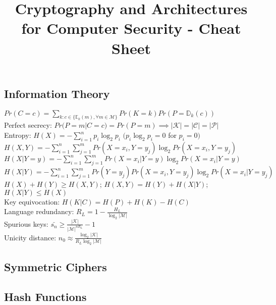 \documentclass[twoside, 11pt]{article}
\title{Cryptography and Architectures for Computer Security - Cheat Sheet}
\author{}
\date{}
\begin{document}
    \maketitle
        
        \subsection*{Information Theory}
            $Pr(C=c) = \sum_{k : c \in \lbrace \mathds{E}_{k}(m), \forall m \in \mathcal{M} \rbrace} Pr(K = k)Pr(P = \mathds{D}_k(c))$ \\
            Perfect secrecy: $Pr(P=m|C=c) = Pr(P=m) \implies |\mathcal{K}| = |\mathcal{C}| = |\mathcal{P}|$ \\
            Entropy: $H(X) = -\sum_{i=1}^{n} p_{i}\log_{2}p_{i}$ \quad $(p_{i}\log_{2}p_{i} = 0$ for $p_{i} = 0)$ \\
            $H(X, Y) = - \sum_{i=1}^{n} \sum_{j=1}^{m}Pr(X = x_{i}, Y = y_{j})\log_{2}Pr(X = x_{i}, Y = y_{j})$ \\
            $H(X | Y = y) = - \sum_{i=1}^{n} \sum_{j=1}^{m}Pr(X=x_{i} |Y = y)\log_{2}Pr(X = x_{i} | Y = y)$ \\
            $H(X | Y) = - \sum_{i=1}^{n} \sum_{j=1}^{m}Pr(Y = y_{j})Pr(X = x_{i}, Y=y_{j})\log_{2}Pr(X = x_{i} | Y = y_{j})$ \\
            $H(X) + H(Y) \geqslant H(X, Y)$; $H(X, Y)  = H(Y) + H(X|Y)$; $H(X|Y) \leqslant H(X)$ \\
            Key equivocation: $H(K|C) = H(P)+H(K)-H(C)$ \\
            Language redundancy: $R_{L} = 1 - \frac{H_{L}}{\log_{2}|\mathcal{M}|}$ \\
            Spurious keys: $\bar{s_{n}} \geqslant \frac{|\mathcal{K}|}{|\mathcal{M}|^{nR_{L}}}-1$ \\
            Unicity distance: $n_{0} \approx \frac{\log_{2}|\mathcal{K}|}{R_{L}\log_{2}|\mathcal{M}|}$
        
        \subsection*{Symmetric Ciphers}

        \subsection*{Hash Functions}
\end{document}
